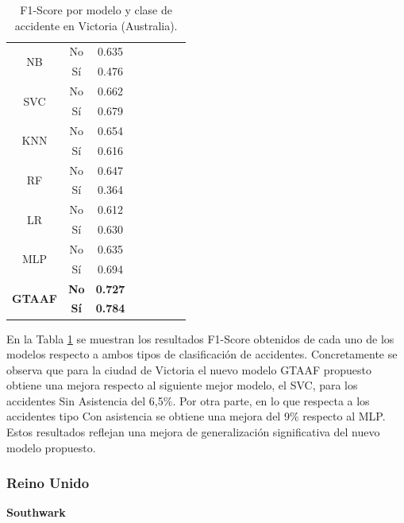 \documentclass{uathesis-es}
\begin{document}
{\begin{table}[H]
\begin{center}
\begin{tabular}{|c|c||c|c|c|c|c|c|}
					\multirow{2}{*}{NB} &
					No &  0.635 \\ &
					Sí & 0.476 \\ \hline \hline
					\multirow{2}{*}{SVC} &
					No & 0.662 \\ &
					Sí &  0.679 \\ \hline \hline
					\multirow{2}{*}{KNN} &
					No  & 0.654 \\ &
					Sí & 0.616 \\ \hline \hline
					\multirow{2}{*}{RF} &
					No & 0.647 \\ &
					Sí & 0.364  \\ \hline \hline
					\multirow{2}{*}{LR} &
					No &  0.612 \\ &
					Sí & 0.630 \\ \hline \hline
					\multirow{2}{*}{MLP} &
					No & 0.635 \\ &
					Sí & 0.694 \\ \hline \hline
					\multirow{2}{*}{\textbf{GTAAF}} &
					\textbf{No} & \textbf{0.727} \\ &
					\textbf{Sí} & \textbf{0.784} \\ \hline \hline
				\end{tabular}
			\end{center}
			\caption{F1-Score por modelo y clase de accidente en Victoria (Australia).}
			\label{AustraliaMetrics}
		\end{table}
		
		En la Tabla \ref{AustraliaMetrics} se muestran los resultados F1-Score obtenidos de cada uno de los modelos respecto a ambos tipos de clasificación de accidentes. Concretamente se observa que para la ciudad de Victoria el nuevo modelo GTAAF propuesto obtiene una mejora respecto al siguiente mejor modelo, el SVC, para los accidentes Sin Asistencia del 6,5\%. Por otra parte, en lo que respecta a los accidentes tipo Con asistencia se obtiene una mejora del 9\% respecto al MLP. Estos resultados reflejan una mejora de generalización significativa del nuevo modelo propuesto.
		
		
		\subsubsection*{Reino Unido}
		
		\textbf{Southwark}\\
		
}
\end{document}
